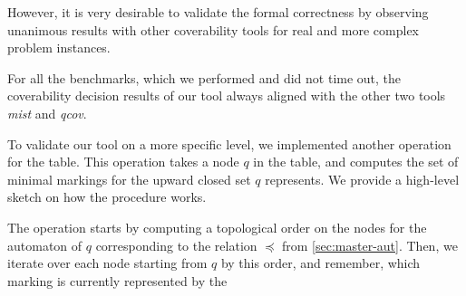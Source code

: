 However, it is very desirable to validate the formal correctness by observing unanimous results with other coverability tools for real and more complex problem instances.

For all the benchmarks, which we performed and did not time out, the coverability decision results of our tool always aligned with the other two tools \textit{mist} and \textit{qcov}. 

To validate our tool on a more specific level, we implemented another operation for the table. This operation takes a node $q$ in the table, and computes the set of minimal markings for the upward closed set $q$ represents. We provide a high-level sketch on how the procedure works.

The operation starts by computing a topological order on the nodes for the automaton of $q$ corresponding to the relation $\preceq$ from \autoref{sec:master-aut}. Then, we iterate over each node starting from $q$ by this order, and remember, which marking is currently represented by the 

